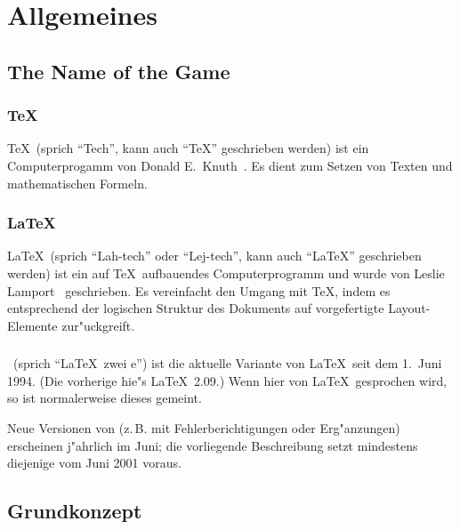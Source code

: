 

\section{Allgemeines}
 
\subsection{The Name of the Game}
 
\subsubsection{\TeX}

\TeX\ (sprich "`Tech"', kann auch "`TeX"' geschrieben werden) ist
ein Computer\-progamm von Donald E.~Knuth~\cite{texbook,schwarz}.
Es dient zum Setzen 
von Texten und mathematischen Formeln.
 
\subsubsection{\LaTeX}
 
\LaTeX\ (sprich "`Lah-tech"' oder "`Lej-tech"', kann auch
"`LaTeX"' geschrieben werden) ist ein auf \TeX\ auf\/bauendes 
Computerprogramm und wurde von Leslie Lamport~\cite{manual,wonne} 
geschrieben.  Es vereinfacht den Umgang mit \TeX, indem es 
entsprechend der logischen Struktur des Dokuments auf vorgefertigte
Layout-Elemente zur"uckgreift.

\subsubsection{\LaTeXe}

\LaTeXe\ (sprich "`\LaTeX\ zwei e"') ist die aktuelle Variante von
\LaTeX\ seit dem 1.~Juni 1994.  (Die vorherige hie"s \LaTeX~2.09.)
Wenn hier von \LaTeX\ gesprochen wird, so ist normalerweise dieses
\LaTeXe{} gemeint.

Neue Versionen
von \LaTeXe{} (z.\,B. mit Fehlerberichtigungen oder Er\-g"an\-zun\-gen)
erscheinen j"ahrlich im Juni; die vorliegende Beschreibung setzt 
mindestens diejenige vom Juni 2001 voraus.  

\subsection{Grundkonzept}
 
